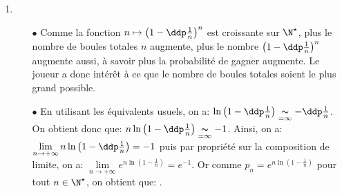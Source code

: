 \begin{correction}
\begin{enumerate}
\item 
\begin{itemize}
\item[$\bullet$] Comme la fonction $n\mapsto \left(1- \ddp\frac{1}{n} \right)^n$ est croissante sur $\N^{\star}$, plus le nombre de boules totales $n$ augmente, plus le nombre $\left(1- \ddp\frac{1}{n} \right)^n$ augmente aussi, \`{a} savoir plus la probabilit\'e de gagner augmente. Le joueur a donc int\'er\^{e}t \`{a} ce que le nombre de boules totales soient le plus grand possible. 
\item[$\bullet$] En utilisant les \'equivalents usuels, on a: $\ln{\left(1- \ddp\frac{1}{n} \right)}\underset{=\infty}{\thicksim} -\ddp\frac{1}{n}$. On obtient donc que: $n\ln{\left(1- \ddp\frac{1}{n} \right)}\underset{=\infty}{\thicksim} -1$. Ainsi, on a: $\lim\limits_{n\to +\infty} n\ln{\left(1- \ddp\frac{1}{n} \right)}=-1$ puis par propri\'et\'e sur la composition de limite, on a: $\lim\limits_{n\to +\infty} e^{n\ln{\left(1- \frac{1}{n} \right)}}=e^{-1}$. Or comme $p_n=e^{n\ln{\left(1- \frac{1}{n} \right)}}$ pour tout $n\in\N^{\star}$, on obtient que: .  
\end{itemize}
\end{enumerate}
\end{correction}